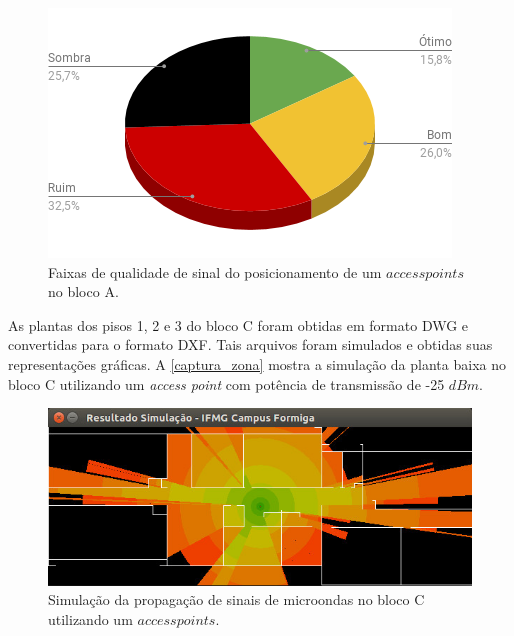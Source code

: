 \documentclass[
	12pt,				%
	twoside,			%
	a4paper,			%
	english,			%
	french,				%
	spanish,			%
	brazil				%
	]{abntex2}
\begin{document}
\begin{figure}[ht]
    \caption{\label{percent_2_aps_bloco_c} Faixas de qualidade de sinal do posicionamento de um $access points$ no bloco A.}
    \begin{center}
        \includegraphics[scale=0.51]{imagens/prop-bloco-percent-a-2.png}
    \end{center}
\end{figure}

\clearpage

As plantas dos pisos 1, 2 e 3 do bloco C foram obtidas em formato DWG e
convertidas para o formato DXF. Tais arquivos foram simulados e obtidas
suas representações gráficas. A \autoref{captura_zona} mostra a
simulação da planta baixa no bloco C utilizando um \emph{access point}
com potência de transmissão de -25 \(dBm\).

\begin{figure}[ht]
    \caption{\label{captura_zona} Simulação da propagação de sinais de microondas no bloco C utilizando um $access points$.
        }
    \begin{center}
        \includegraphics[scale=0.7]{imagens/captura-zona-2.jpg}
    \end{center}
\end{figure}
\end{document}
